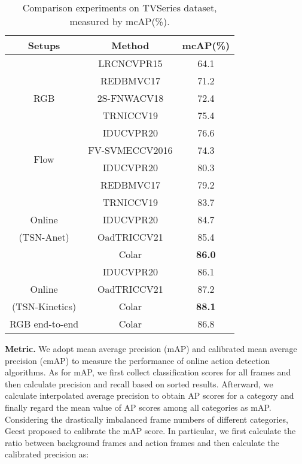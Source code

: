 \documentclass[10pt,twocolumn,letterpaper]{article}
\begin{document}
\begin{table}[thbp]
  \centering
  \caption{Comparison experiments on TVSeries dataset, measured by mcAP(\%).}
  \begin{tabular}{cc|c}
    \toprule
    \toprule
    Setups & Method & mcAP(\%) \\
    \midrule
    \midrule
          & LRCN\cite{donahue2015long}{\scriptsize CVPR15} & 64.1 \\
          & RED\cite{gao2017red}{\scriptsize BMVC17} & 71.2 \\
    RGB   & 2S-FN\cite{de2018modeling}{\scriptsize WACV18} & 72.4 \\
          & TRN\cite{xu2019temporal}{\scriptsize ICCV19} & 75.4 \\
          & IDU\cite{eun2020learning}{\scriptsize CVPR20} & 76.6 \\
    \midrule
    \multirow{2}[2]{*}{Flow} & FV-SVM\cite{de2016online}{\scriptsize ECCV2016} & 74.3 \\
          & IDU\cite{eun2020learning}{\scriptsize CVPR20} & 80.3 \\
    \midrule
          & RED\cite{gao2017red}{\scriptsize BMVC17} & 79.2 \\
          & TRN\cite{xu2019temporal}{\scriptsize ICCV19} & 83.7 \\
    Online & IDU\cite{eun2020learning}{\scriptsize CVPR20} & 84.7 \\
    (TSN-Anet) & OadTR\cite{wang2021oadtr}{\scriptsize ICCV21} & 85.4 \\
          & Colar & \textbf{86.0} \\
    \midrule
          & IDU\cite{eun2020learning}{\scriptsize CVPR20} & 86.1 \\
    Online & OadTR\cite{wang2021oadtr}{\scriptsize ICCV21} & 87.2 \\
    (TSN-Kinetics) & Colar & \textbf{88.1} \\
    \midrule
    RGB end-to-end & Colar & 86.8 \\
    \bottomrule
    \end{tabular}\label{tabCmpTVSeries}\end{table}


\textbf{Metric.} We adopt mean average precision (mAP) and calibrated mean average precision (cmAP) to measure the performance of online action detection algorithms. As for mAP, we first collect classification scores for all frames and then calculate precision and recall based on sorted results. Afterward, we calculate interpolated average precision to obtain AP scores for a category and finally regard the mean value of AP scores among all categories as mAP. Considering the drastically imbalanced frame numbers of different categories, Geest \etal \cite{de2016online} proposed to calibrate the mAP score. In particular, we first calculate the ratio  between background frames and action frames and then calculate the calibrated precision as:
\end{document}
